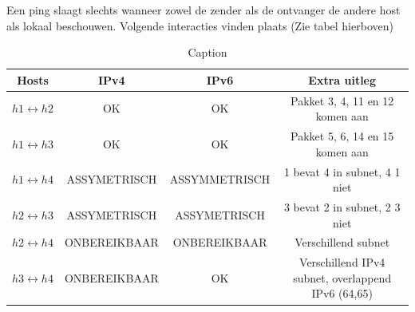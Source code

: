 Een ping slaagt slechts wanneer zowel de zender als de ontvanger de andere host als lokaal beschouwen. Volgende interacties vinden plaats (Zie tabel hierboven)\\
\begin{table}[]
    \centering
    \begin{tabular}{c|c|c|c}
       Hosts & IPv4 & IPv6 & Extra uitleg\\ \hline
       $h1 \leftrightarrow h2$ & OK & OK & Pakket 3, 4, 11 en 12 komen aan \\
       $h1 \leftrightarrow h3$  & OK & OK & Pakket 5, 6, 14 en 15 komen aan\\
       $h1 \leftrightarrow h4$  & ASSYMETRISCH & ASSYMMETRISCH & 1 bevat 4 in subnet, 4 1 niet\\
       $h2 \leftrightarrow h3$  & ASSYMETRISCH & ASSYMETRISCH & 3 bevat 2 in subnet, 2 3 niet \\
       $h2 \leftrightarrow h4$  & ONBEREIKBAAR& ONBEREIKBAAR & Verschillend subnet\\
       $h3 \leftrightarrow h4$  & ONBEREIKBAAR & OK & Verschillend IPv4 subnet, overlappend IPv6 (64,65)\\
    \end{tabular}
    \caption{Caption}
    \label{tab:placeholder}
\end{table}